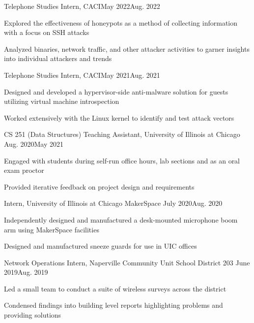 \documentclass[10.5pt]{resume}
\begin{document}
\begin{Experience}
	\begin{ExpEntry}{Telephone Studies Intern, CACI}{May 2022}{Aug. 2022}
		\item Explored the effectiveness of honeypots as a method of collecting information with a focus on SSH attacks
		\item Analyzed binaries, network traffic, and other attacker activities to garner insights into individual attackers and trends
	\end{ExpEntry}

	\begin{ExpEntry}{Telephone Studies Intern, CACI}{May 2021}{Aug. 2021}
			\item Designed and developed a hypervisor-side anti-malware solution for guests utilizing virtual machine introspection
			\item Worked extensively with the Linux kernel to identify and test attack vectors
	\end{ExpEntry}

	\begin{ExpEntry}{CS 251 (Data Structures) Teaching Assistant, University of Illinois at Chicago}
		{Aug. 2020}{May 2021}
			\item Engaged with students during self-run office hours, lab sections and as an oral exam proctor
			\item Provided iterative feedback on project design and requirements
	\end{ExpEntry}

	\begin{ExpEntry}{Intern, University of Illinois at Chicago MakerSpace}
		{July 2020}{Aug. 2020}
		\item Independently designed and manufactured a desk-mounted microphone boom arm using MakerSpace facilities
		\item Designed and manufactured sneeze guards for use in UIC offices
	\end{ExpEntry}

	\begin{ExpEntry}{Network Operations Intern, Naperville Community Unit School District 203}
		{June 2019}{Aug. 2019}
		\item Led a small team to conduct a suite of wireless surveys across the district
		\item Condensed findings into building level reports highlighting problems and providing solutions
	\end{ExpEntry} 


\end{Experience}
\end{document}
